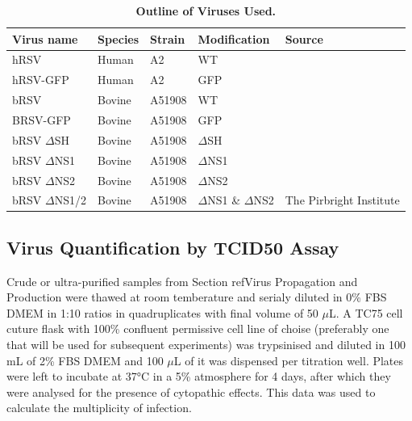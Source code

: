 \begin{table}
\centering
\begin{tabular}{lllll}
\toprule
{\textbf{Virus name}} &
  {\textbf{Species}} &
  { \textbf{Strain}} &
  { \textbf{Modification}} &
  { \textbf{Source}} \\ \midrule
hRSV      & Human  & A2     & WT   &  \\ 
hRSV-GFP  & Human  & A2     & GFP  &  \\ 
bRSV      & Bovine & A51908 & WT   &  \\ 
BRSV-GFP  & Bovine & A51908 & GFP  &  \\ 
bRSV \(\Delta\)SH  & Bovine & A51908 & \(\Delta\)SH  &  \\ 
bRSV \(\Delta\)NS1 & Bovine & A51908 & \(\Delta\)NS1 &  \\ 
bRSV \(\Delta\)NS2 & Bovine & A51908 & \(\Delta\)NS2 &  \\ 
bRSV \(\Delta\)NS1/2 &
  Bovine &
  A51908 &
  \(\Delta\)NS1 \& \(\Delta\)NS2 &
  \multirow{-8}{*}{The Pirbright Institute} \\ \bottomrule
\end{tabular}
\caption[Outline of Viruses Used.]{\textbf{Outline of Viruses Used.}}
\label{tab:Outline of Viruses Used table}
\end{table}

\subsection{Virus Quantification by TCID50 Assay} \label{subsec:Virus Quantification by TCID50 Assay}
Crude or ultra-purified samples from Section ref{Virus Propagation and Production} were thawed at room temberature and serialy diluted in 0\% FBS DMEM in 1:10 ratios in quadruplicates with final volume of 50 \(\mu\)L. A TC75 cell cuture flask with 100\% confluent permissive cell line of choise (preferably one that will be used for subsequent experiments) was trypsinised and diluted in 100 mL of 2\% FBS DMEM and 100 \(\mu\)L of it was dispensed per titration well. Plates were left to incubate at 37°C in a 5\%  atmosphere for 4 days, after which they were analysed for the presence of cytopathic effects. This data was used to calculate the multiplicity of infection.

